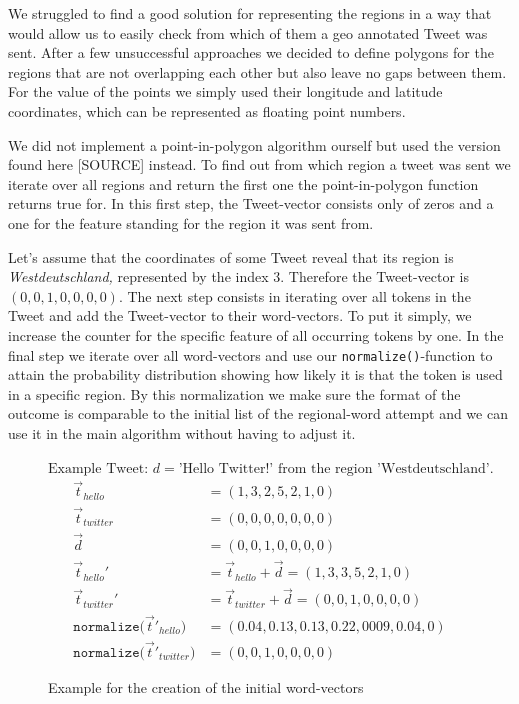 \documentclass[../Main.tex]{subfiles}
\begin{document}
We struggled to find a good solution for representing the regions in a way that would allow us to easily check from which of them a geo annotated Tweet was sent. After a few unsuccessful approaches we decided to define polygons for the regions that are not overlapping each other but also leave no gaps between them. For the value of the points we simply used their longitude and latitude coordinates, which can be represented as floating point numbers.

We did not implement a point-in-polygon algorithm ourself but used the version found here [SOURCE] instead. 
To find out from which region a tweet was sent we iterate over all regions and return the first one the point-in-polygon function returns true for.
In this first step, the Tweet-vector consists only of zeros and a one for the feature standing for the region it was sent from. 

Let's assume that the coordinates of some Tweet reveal that its region is \textit{Westdeutschland,} represented by the index $3$.
Therefore the Tweet-vector is $(0,0,1,0,0,0,0)$. 
The next step consists in iterating over all tokens in the Tweet and add the Tweet-vector to their word-vectors. To put it simply, we increase the counter for the specific feature of all occurring tokens by one. 
In the final step we iterate over all word-vectors and use our \texttt{normalize()}-function to attain the probability distribution showing how likely it is that the token is used in a specific region. By this normalization we make sure the format of the outcome is comparable to the initial list of the regional-word attempt and we can use it in the main algorithm without having to adjust it.

\begin{figure}
\centering $\textrm{Example Tweet: } d = \textrm{'Hello Twitter!'} \textrm{ from the region 'Westdeutschland'.}$
 \begin{align*}
    \vec{t}_{hello} &= (1,3,2,5,2,1,0) \\
     \vec{t}_{twitter} &= (0,0,0,0,0,0,0) \\
      \vec{d} &= (0,0,1,0,0,0,0) \\
     \vec{t}_{hello}' &= \vec{t}_{hello} + \vec{d} =  (1,3,3,5,2,1,0) \\
    \vec{t}_{twitter} ' &= \vec{t}_{twitter} + \vec{d} = (0,0,1,0,0,0,0) \\
     \texttt{normalize(}\vec{t}'_{hello}\texttt{)} &= (0.04, 0.13, 0.13, 0.22, 0009, 0.04, 0) \\
     \texttt{normalize(}\vec{t}'_{twitter}\texttt{)} &= (0,0,1,0,0,0,0)
  \end{align*}
  \caption{Example for the creation of the initial word-vectors}
  \label{geo_example1}
\end{figure}
\end{document}
